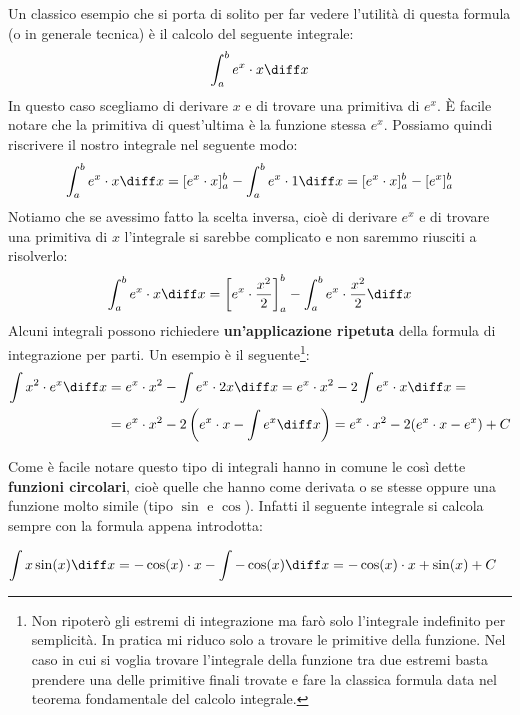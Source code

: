 Un classico esempio che si porta di solito per far vedere l'utilità di questa 
formula (o in generale tecnica) è il calcolo del seguente integrale:
\begin{equation*}
	\int_a^b e^x \cdot x\diff x
\end{equation*}
In questo caso scegliamo di derivare $x$ e di trovare una primitiva di $e^x$. 
È facile notare che la primitiva di quest'ultima è la funzione stessa $e^x$. 
Possiamo quindi riscrivere il nostro integrale nel seguente modo:
\begin{equation*}
	\int_a^b e^x \cdot x \diff x = [e^x \cdot x]_a^b - \int_a^b e^x \cdot 1 
    \diff x = [e^x \cdot x]_a^b - [e^x]_a^b
\end{equation*}
Notiamo che se avessimo fatto la scelta inversa, cioè di derivare $e^x$ e di 
trovare una primitiva di $x$ l'integrale si sarebbe complicato e non saremmo 
riusciti a risolverlo:
\begin{equation*}
	\int_a^b e^x \cdot x\diff x = \left[e^x \cdot \dfrac{x^2}{2}\right]_a^b - 
    \int_a^b e^x \cdot \dfrac{x^2}{2} \diff x
\end{equation*}
Alcuni integrali possono richiedere \textbf{un'applicazione ripetuta} della 
formula di integrazione per parti. Un esempio è il seguente\footnote{Non 
ripoterò gli estremi di integrazione ma farò solo l'integrale indefinito per 
semplicità. In pratica mi riduco solo a trovare le primitive della funzione. 
Nel caso in cui si voglia trovare l'integrale della funzione tra due estremi 
basta prendere una delle primitive finali trovate e fare la classica formula 
data nel teorema fondamentale del calcolo integrale.}:
\begin{align*}
	\int x^2 \cdot e^x \diff x &= e^x \cdot x^2 - \int e^x \cdot 2 x \diff 
    x = e^x \cdot x^2 - 2 \int e^x \cdot x \diff x = \\
	&= e^x \cdot x^2 - 2 \left(e^x \cdot x - \int e^x \diff x \right) 
    = e^x \cdot x^2 - 2 (e^x \cdot x - e^x) + C
\end{align*}

Come è facile notare questo tipo di integrali hanno in comune le così dette 
\textbf{funzioni circolari}, cioè quelle che hanno come derivata o se stesse 
oppure una funzione molto simile (tipo $\sin$ e $\cos$). Infatti il seguente 
integrale si calcola sempre con la formula appena introdotta:

\begin{align*}
	\int x \sin(x) \diff x &= -\cos(x) \cdot x - \int -\cos(x) \diff x = 
    -\cos(x) \cdot x + \sin(x) + C
\end{align*}

